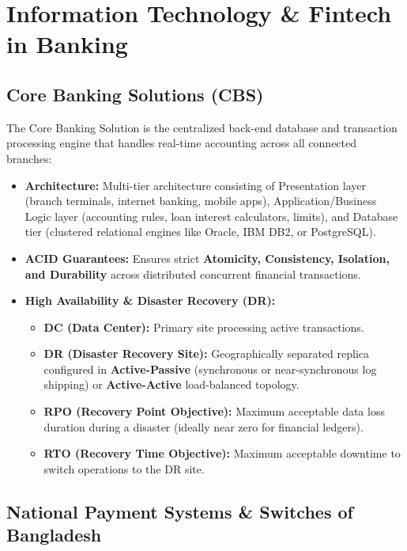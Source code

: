\medskip

\section{Information Technology \& Fintech in Banking}

\subsection{Core Banking Solutions (CBS)}

The Core Banking Solution is the centralized back-end database and transaction processing engine that handles real-time accounting across all connected branches:

\begin{itemize}
  \item \textbf{Architecture:} Multi-tier architecture consisting of Presentation layer (branch terminals, internet banking, mobile apps), Application/Business Logic layer (accounting rules, loan interest calculators, limits), and Database tier (clustered relational engines like Oracle, IBM DB2, or PostgreSQL).
  \item \textbf{ACID Guarantees:} Ensures strict \textbf{Atomicity, Consistency, Isolation, and Durability} across distributed concurrent financial transactions.
  \item \textbf{High Availability \& Disaster Recovery (DR):}
  \begin{itemize}
    \item \textbf{DC (Data Center):} Primary site processing active transactions.
    \item \textbf{DR (Disaster Recovery Site):} Geographically separated replica configured in \textbf{Active-Passive} (synchronous or near-synchronous log shipping) or \textbf{Active-Active} load-balanced topology.
    \item \textbf{RPO (Recovery Point Objective):} Maximum acceptable data loss duration during a disaster (ideally near zero for financial ledgers).
    \item \textbf{RTO (Recovery Time Objective):} Maximum acceptable downtime to switch operations to the DR site.
  \end{itemize}
\end{itemize}

\medskip

\subsection{National Payment Systems \& Switches of Bangladesh}

